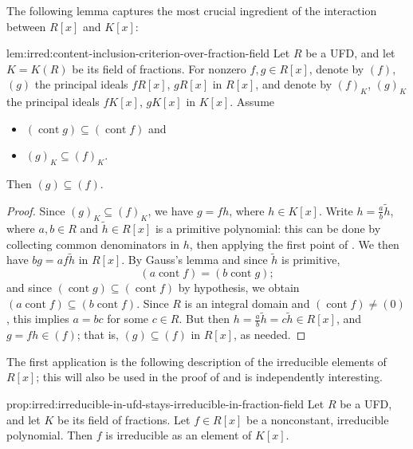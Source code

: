 The following lemma captures the most crucial ingredient of the
interaction between $R[x]$ and $K[x]$:
\begin{lem}{}{lem:irred:content-inclusion-criterion-over-fraction-field}
  Let $R$ be a UFD, and let $K = K(R)$ be its field of fractions. For
  nonzero $f, g \in R[x]$, denote by $(f)$, $(g)$ the principal ideals
  $fR[x]$, $gR[x]$ in $R[x]$, and denote by $(f)_K$, $(g)_K$ the
  principal ideals $fK[x]$, $gK[x]$ in $K[x]$. Assume
  \begin{itemize}
  \item $(\operatorname{cont} g) \subseteq (\operatorname{cont} f)$
    and
  \item $(g)_K \subseteq (f)_K$.
  \end{itemize}
  Then $(g) \subseteq (f)$.
\end{lem}
\begin{proof}
  Since $(g)_K \subseteq (f)_K$, we have $g = fh$, where $h \in K[x]$.
  Write $h = \frac{a}{b} \tilde{h}$, where $a, b \in R$ and
  $\tilde{h} \in R[x]$ is a primitive polynomial: this can be done by
  collecting common denominators in $h$, then applying the first point
  of . We then have $bg = af\tilde{h}$ in
  $R[x]$. By Gauss's lemma and since $\tilde{h}$ is primitive,
  \[(a \operatorname{cont} f) = (b \operatorname{cont} g);\] and since
  $(\operatorname{cont} g) \subseteq (\operatorname{cont} f)$ by
  hypothesis, we obtain
  $(a \operatorname{cont} f) \subseteq (b \operatorname{cont} f)$.
  Since $R$ is an integral domain and
  $(\operatorname{cont} f) \neq (0)$, this implies $a = bc$ for some
  $c \in R$. But then
  $h = \frac{a}{b} \tilde{h} = c\tilde{h} \in R[x]$, and
  $g = fh \in (f)$; that is, $(g) \subseteq (f)$ in $R[x]$, as needed.
\end{proof}
The first application is the following description of the irreducible
elements of $R[x]$; this will also be used in the proof of
 and is independently interesting.

\begin{prop}{}{prop:irred:irreducible-in-ufd-stays-irreducible-in-fraction-field}
  Let $R$ be a UFD, and let $K$ be its field of fractions. Let
  $f \in R[x]$ be a nonconstant, irreducible polynomial. Then $f$ is
  irreducible as an element of $K[x]$.
\end{prop}

